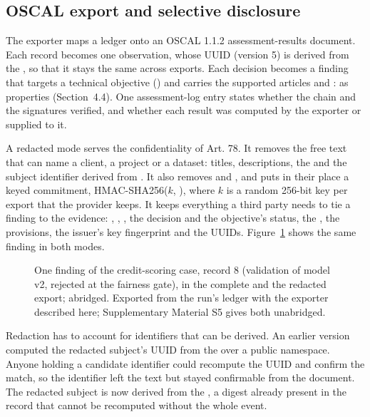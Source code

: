 \subsection{OSCAL export and selective disclosure}

The exporter maps a ledger onto an OSCAL 1.1.2 assessment-results document. Each record becomes one observation, whose UUID (version 5) is derived from the , so that it stays the same across exports. Each decision becomes a finding that targets a technical objective () and carries the supported articles and :  as properties (Section~4.4). One assessment-log entry states whether the chain and the signatures verified, and whether each result was computed by the exporter or supplied to it.

A redacted mode serves the confidentiality of Art. 78. It removes the free text that can name a client, a project or a dataset: titles, descriptions, the  and the subject identifier derived from . It also removes  and , and puts in their place a keyed commitment, HMAC-SHA256($k$, ), where $k$ is a random 256-bit key per export that the provider keeps. It keeps everything a third party needs to tie a finding to the evidence: , , , the decision and the objective's status, the , the  provisions, the issuer's key fingerprint and the UUIDs. Figure~\ref{fig:redaction} shows the same finding in both modes.

\begin{figure}[t]

\caption{One finding of the credit-scoring case, record 8 (validation of model v2, rejected at the fairness gate), in the complete and the redacted export; abridged. Exported from the run's ledger with the exporter described here; Supplementary Material S5 gives both unabridged.}
\label{fig:redaction}
\end{figure}

Redaction has to account for identifiers that can be derived. An earlier version computed the redacted subject's UUID from the  over a public namespace. Anyone holding a candidate identifier could recompute the UUID and confirm the match, so the identifier left the text but stayed confirmable from the document. The redacted subject is now derived from the , a digest already present in the record that cannot be recomputed without the whole event.


